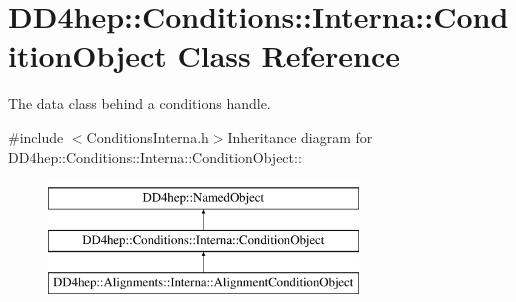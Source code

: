 \hypertarget{class_d_d4hep_1_1_conditions_1_1_interna_1_1_condition_object}{
\section{DD4hep::Conditions::Interna::ConditionObject Class Reference}
\label{class_d_d4hep_1_1_conditions_1_1_interna_1_1_condition_object}
}


The data class behind a conditions handle.  


{\ttfamily \#include $<$ConditionsInterna.h$>$}Inheritance diagram for DD4hep::Conditions::Interna::ConditionObject::\begin{figure}[H]
\begin{center}
\leavevmode
\includegraphics[height=3cm]{class_d_d4hep_1_1_conditions_1_1_interna_1_1_condition_object}
\end{center}
\end{figure}
